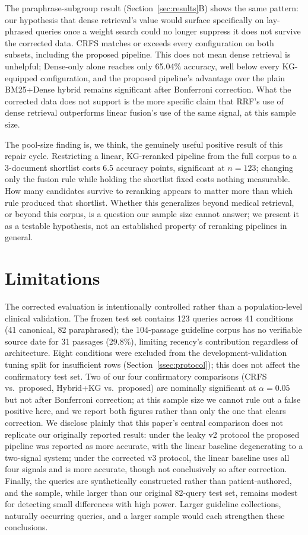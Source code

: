 \documentclass[10pt,conference]{IEEEtran}
\begin{document}
The paraphrase-subgroup result (Section~\ref{sec:results}B) shows the same pattern: our hypothesis that dense retrieval's value would surface specifically on lay-phrased queries once a weight search could no longer suppress it does not survive the corrected data. CRFS matches or exceeds every configuration on both subsets, including the proposed pipeline. This does not mean dense retrieval is unhelpful; Dense-only alone reaches only 65.04\% accuracy, well below every KG-equipped configuration, and the proposed pipeline's advantage over the plain BM25+Dense hybrid remains significant after Bonferroni correction. What the corrected data does not support is the more specific claim that RRF's use of dense retrieval outperforms linear fusion's use of the same signal, at this sample size.

The pool-size finding is, we think, the genuinely useful positive result of this repair cycle. Restricting a linear, KG-reranked pipeline from the full corpus to a 3-document shortlist costs 6.5 accuracy points, significant at $n=123$; changing only the fusion rule while holding the shortlist fixed costs nothing measurable. How many candidates survive to reranking appears to matter more than which rule produced that shortlist. Whether this generalizes beyond medical retrieval, or beyond this corpus, is a question our sample size cannot answer; we present it as a testable hypothesis, not an established property of reranking pipelines in general.

\section{Limitations}

The corrected evaluation is intentionally controlled rather than a population-level clinical validation. The frozen test set contains 123 queries across 41 conditions (41 canonical, 82 paraphrased); the 104-passage guideline corpus has no verifiable source date for 31 passages (29.8\%), limiting recency's contribution regardless of architecture. Eight conditions were excluded from the development-validation tuning split for insufficient rows (Section~\ref{ssec:protocol}); this does not affect the confirmatory test set. Two of our four confirmatory comparisons (CRFS vs.\ proposed, Hybrid+KG vs.\ proposed) are nominally significant at $\alpha=0.05$ but not after Bonferroni correction; at this sample size we cannot rule out a false positive here, and we report both figures rather than only the one that clears correction. We disclose plainly that this paper's central comparison does not replicate our originally reported result: under the leaky v2 protocol the proposed pipeline was reported as more accurate, with the linear baseline degenerating to a two-signal system; under the corrected v3 protocol, the linear baseline uses all four signals and is more accurate, though not conclusively so after correction. Finally, the queries are synthetically constructed rather than patient-authored, and the sample, while larger than our original 82-query test set, remains modest for detecting small differences with high power. Larger guideline collections, naturally occurring queries, and a larger sample would each strengthen these conclusions.
\end{document}
